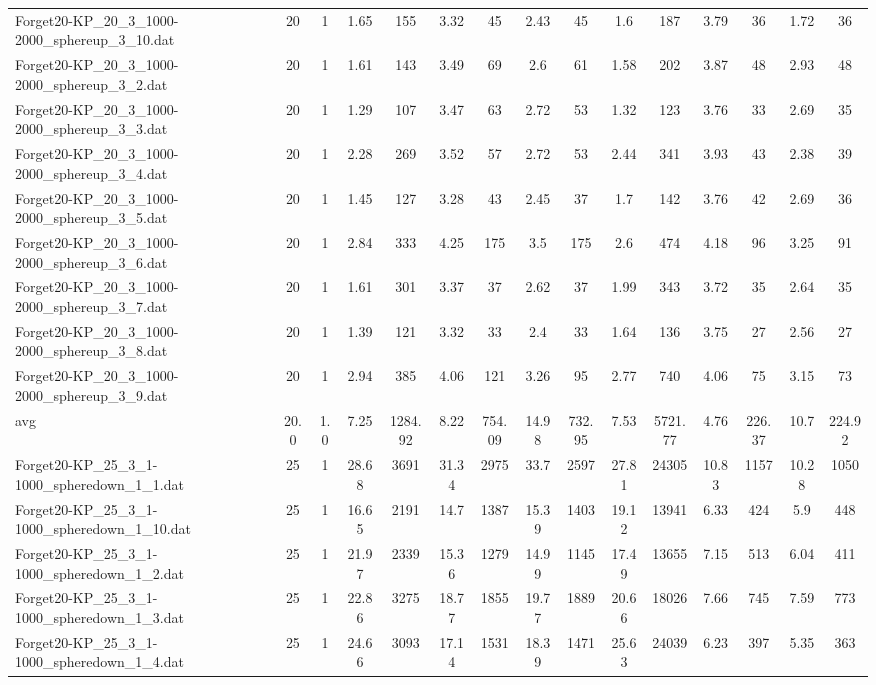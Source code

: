 \begin{table}[!ht]
{\begin{tabular}{lcccccccccccccc}
Forget20-KP\_20\_3\_1000-2000\_sphereup\_3\_10.dat & 20 & 1 & 1.65 & 155 & 3.32 & 45 & 2.43 & 45 & 1.6 & 187 & 3.79 & 36 & 1.72 & 36 \\
Forget20-KP\_20\_3\_1000-2000\_sphereup\_3\_2.dat & 20 & 1 & 1.61 & 143 & 3.49 & 69 & 2.6 & 61 & 1.58 & 202 & 3.87 & 48 & 2.93 & 48 \\
Forget20-KP\_20\_3\_1000-2000\_sphereup\_3\_3.dat & 20 & 1 & 1.29 & 107 & 3.47 & 63 & 2.72 & 53 & 1.32 & 123 & 3.76 & 33 & 2.69 & 35 \\
Forget20-KP\_20\_3\_1000-2000\_sphereup\_3\_4.dat & 20 & 1 & 2.28 & 269 & 3.52 & 57 & 2.72 & 53 & 2.44 & 341 & 3.93 & 43 & 2.38 & 39 \\
Forget20-KP\_20\_3\_1000-2000\_sphereup\_3\_5.dat & 20 & 1 & 1.45 & 127 & 3.28 & 43 & 2.45 & 37 & 1.7 & 142 & 3.76 & 42 & 2.69 & 36 \\
Forget20-KP\_20\_3\_1000-2000\_sphereup\_3\_6.dat & 20 & 1 & 2.84 & 333 & 4.25 & 175 & 3.5 & 175 & 2.6 & 474 & 4.18 & 96 & 3.25 & 91 \\
Forget20-KP\_20\_3\_1000-2000\_sphereup\_3\_7.dat & 20 & 1 & 1.61 & 301 & 3.37 & 37 & 2.62 & 37 & 1.99 & 343 & 3.72 & 35 & 2.64 & 35 \\
Forget20-KP\_20\_3\_1000-2000\_sphereup\_3\_8.dat & 20 & 1 & 1.39 & 121 & 3.32 & 33 & 2.4 & 33 & 1.64 & 136 & 3.75 & 27 & 2.56 & 27 \\
Forget20-KP\_20\_3\_1000-2000\_sphereup\_3\_9.dat & 20 & 1 & 2.94 & 385 & 4.06 & 121 & 3.26 & 95 & 2.77 & 740 & 4.06 & 75 & 3.15 & 73 \\
\hline avg & 20.0 & 1.0 & 7.25& 1284.92 & 8.22& 754.09 & 14.98& 732.95 & 7.53& 5721.77 & 4.76& 226.37 & 10.7& 224.92\\ \hline
Forget20-KP\_25\_3\_1-1000\_spheredown\_1\_1.dat & 25 & 1 & 28.68 & 3691 & 31.34 & 2975 & 33.7 & 2597 & 27.81 & 24305 & 10.83 & 1157 & 10.28 & 1050 \\
Forget20-KP\_25\_3\_1-1000\_spheredown\_1\_10.dat & 25 & 1 & 16.65 & 2191 & 14.7 & 1387 & 15.39 & 1403 & 19.12 & 13941 & 6.33 & 424 & 5.9 & 448 \\
Forget20-KP\_25\_3\_1-1000\_spheredown\_1\_2.dat & 25 & 1 & 21.97 & 2339 & 15.36 & 1279 & 14.99 & 1145 & 17.49 & 13655 & 7.15 & 513 & 6.04 & 411 \\
Forget20-KP\_25\_3\_1-1000\_spheredown\_1\_3.dat & 25 & 1 & 22.86 & 3275 & 18.77 & 1855 & 19.77 & 1889 & 20.66 & 18026 & 7.66 & 745 & 7.59 & 773 \\
Forget20-KP\_25\_3\_1-1000\_spheredown\_1\_4.dat & 25 & 1 & 24.66 & 3093 & 17.14 & 1531 & 18.39 & 1471 & 25.63 & 24039 & 6.23 & 397 & 5.35 & 363 \\

\end{tabular}}
\end{table}
